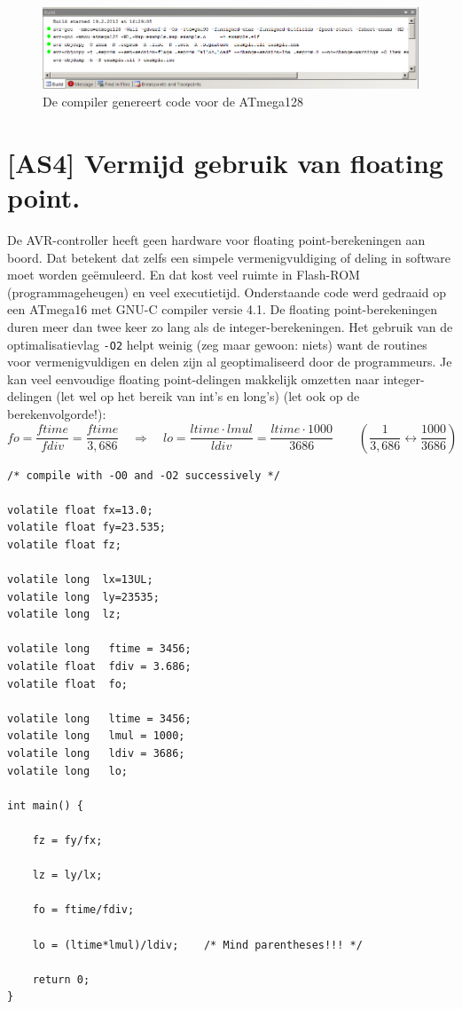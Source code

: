 \documentclass[12pt,a4paper,final,twoside,fleqn]{article}
\def\lstC{\lstinline[style=C]}
\begin{document}
\begin{figure}[h!]
  \centering
  \includegraphics[scale=0.46]{atmega128gcc}
  \caption{De compiler genereert code voor de ATmega128}
  \label{fig:atmega128gcc}
\end{figure}


\section{[AS4] Vermijd gebruik van floating point.}
\label{sec:as4vermijd}
De AVR-controller heeft geen hardware voor floating point-berekeningen aan boord.
Dat betekent dat zelfs een simpele vermenigvuldiging of deling in software moet
worden ge\"{e}muleerd. En dat kost veel ruimte in Flash-ROM (programmageheugen)
en veel executietijd. Onderstaande code werd gedraaid op een ATmega16 met GNU-C
compiler versie 4.1. De floating point-berekeningen
duren meer dan twee keer zo lang als de integer-berekeningen. Het gebruik van de
optimalisatievlag \lstC{-O2} helpt weinig (zeg maar gewoon: niets) want de routines
voor vermenigvuldigen en delen zijn al geoptimaliseerd door de programmeurs.
Je kan veel eenvoudige floating point-delingen makkelijk omzetten naar integer-delingen
(let wel op het bereik van int's en long's) (let ook op de berekenvolgorde!):
%
\begin{equation}
\nonumber
fo = \frac{ftime}{fdiv}=\frac{ftime}{3,686} \quad \Rightarrow \quad
lo = \frac{ltime \cdot lmul}{ldiv} = \frac{ltime \cdot 1000}{3686} \qquad
\left(\frac{1}{3,686} \leftrightarrow \frac{1000}{3686}\right)
\end{equation}

\begin{lstlisting}[style=C,caption=Code met integer en floating point-berekeningen]
/* compile with -O0 and -O2 successively */

volatile float fx=13.0;
volatile float fy=23.535;
volatile float fz;

volatile long  lx=13UL;
volatile long  ly=23535;
volatile long  lz;

volatile long   ftime = 3456;
volatile float  fdiv = 3.686;
volatile float  fo;

volatile long   ltime = 3456;
volatile long   lmul = 1000;
volatile long   ldiv = 3686;
volatile long   lo;

int main() {

	fz = fy/fx;

	lz = ly/lx;

	fo = ftime/fdiv;

	lo = (ltime*lmul)/ldiv;    /* Mind parentheses!!! */

	return 0;
}
\end{lstlisting}
\end{document}
